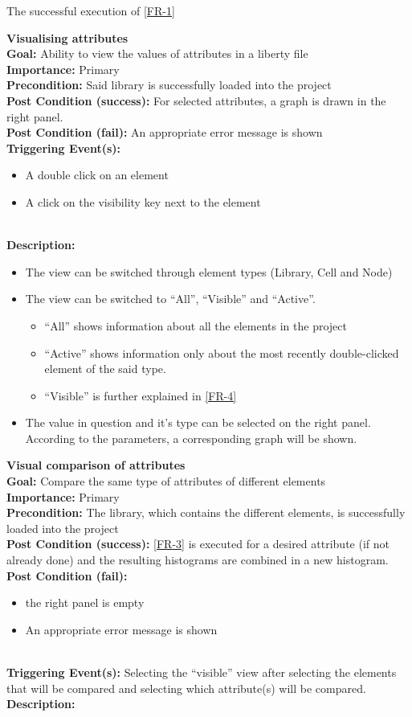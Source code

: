 \documentclass[10pt,a4paper]{report}
\newcommand{\FRDescription}[8]{
    \textbf{#1} \leavevmode \\
    \textbf{Goal: } #2 \leavevmode \\
    \textbf{Importance: } #3 \leavevmode \\
    \textbf{Precondition: } #4 \leavevmode \\
    \textbf{Post Condition (success): } #5 \leavevmode \\
    \textbf{Post Condition (fail): } #6 \leavevmode \\
    \textbf{Triggering Event(s): } #7 \leavevmode \\
    \textbf{Description: } \leavevmode \\ 
    #8}
\begin{document}
\begin{FR}
{\begin{itemize}
    \end{itemize}}
    {The successful execution of \ref{FR-1}}
    \item \FRDescription{Visualising attributes}
    {Ability to view the values of attributes in a liberty file}
    {Primary}
    {Said library is successfully loaded into the project}
    {For selected attributes, a graph is drawn in the right panel.}
    {An appropriate error message is shown}
    {\begin{itemize}
        \item A double click on an element
        \item A click on the visibility key next to the element
    \end{itemize}}
    {\begin{itemize}
        \item The view can be switched through element types (Library, Cell and Node)
        \item The view can be switched to “All”, “Visible” and “Active”.
        \begin{itemize}
            \item “All” shows information about all the elements in the project
            \item “Active” shows information only about the most recently double-clicked element of the said type.
            \item “Visible” is further explained in \ref{FR-4}
        \end{itemize}
        \item The value in question and it’s type can be selected on the right panel. According to the parameters, a corresponding graph will be shown.
    \end{itemize}}
    \item \FRDescription{Visual comparison of attributes}
    {Compare the same type of attributes of different elements}
    {Primary}
    {The library, which contains the different elements,  is successfully loaded into the project}
    {\ref{FR-3} is executed for a desired attribute (if not already done) and the resulting histograms are combined in a new histogram.}
    {
    \begin{itemize}
        \item the right panel is empty
        \item An appropriate error message is shown
    \end{itemize}
    }
    {Selecting the “visible” view after selecting the elements that will be compared and selecting which attribute(s) will be compared.}

\end{FR}
\end{document}
